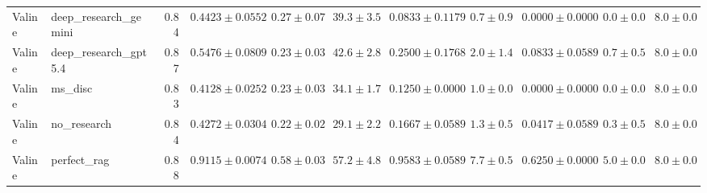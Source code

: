 \begin{table}[htbp]
\begin{tabular}{llrrrrrrrrr}
Valine & deep_research_gemini & 0.84 & $0.4423 \pm 0.0552$ & $0.27 \pm 0.07$ & $39.3 \pm 3.5$ & $0.0833 \pm 0.1179$ & $0.7 \pm 0.9$ & $0.0000 \pm 0.0000$ & $0.0 \pm 0.0$ & $8.0 \pm 0.0$ \\
Valine & deep_research_gpt5.4 & 0.87 & $0.5476 \pm 0.0809$ & $0.23 \pm 0.03$ & $42.6 \pm 2.8$ & $0.2500 \pm 0.1768$ & $2.0 \pm 1.4$ & $0.0833 \pm 0.0589$ & $0.7 \pm 0.5$ & $8.0 \pm 0.0$ \\
Valine & ms_disc & 0.83 & $0.4128 \pm 0.0252$ & $0.23 \pm 0.03$ & $34.1 \pm 1.7$ & $0.1250 \pm 0.0000$ & $1.0 \pm 0.0$ & $0.0000 \pm 0.0000$ & $0.0 \pm 0.0$ & $8.0 \pm 0.0$ \\
Valine & no_research & 0.84 & $0.4272 \pm 0.0304$ & $0.22 \pm 0.02$ & $29.1 \pm 2.2$ & $0.1667 \pm 0.0589$ & $1.3 \pm 0.5$ & $0.0417 \pm 0.0589$ & $0.3 \pm 0.5$ & $8.0 \pm 0.0$ \\
Valine & perfect_rag & 0.88 & \cellcolor{green!25}$0.9115 \pm 0.0074$ & $0.58 \pm 0.03$ & $57.2 \pm 4.8$ & $0.9583 \pm 0.0589$ & $7.7 \pm 0.5$ & $0.6250 \pm 0.0000$ & $5.0 \pm 0.0$ & $8.0 \pm 0.0$ \\
\bottomrule
\end{tabular}
\end{table}